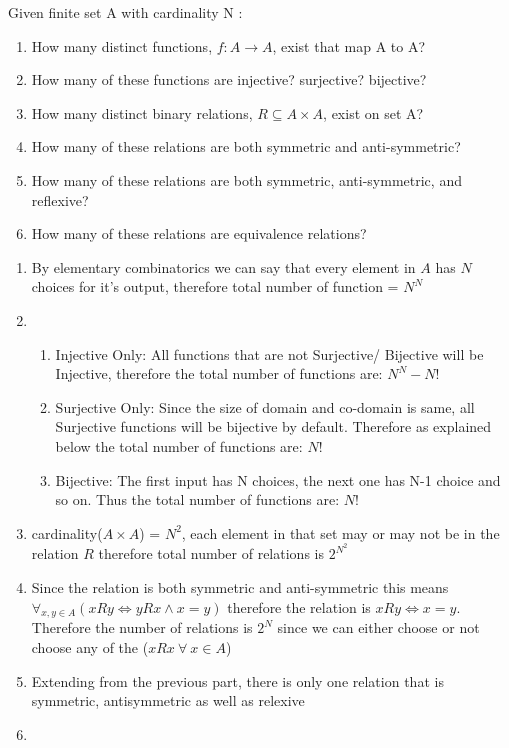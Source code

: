 \documentclass[12pt]{article}
\newenvironment{solution}[2][Solution]{ \begin{trivlist}
\item[\hskip \labelsep {\bfseries #1}]}{\end{trivlist}}
\newenvironment{problem}[2][Problem]{\begin{trivlist}
\item[\hskip \labelsep {\bfseries #1}\hskip \labelsep {\bfseries #2.}]}{\end{trivlist}}
\begin{document}
\vskip 0.5in

\begin{problem}{12}Given finite set A with cardinality N : 
\item[]
\begin{enumerate}[label=\alph*)]
    \item How many distinct functions, $f \colon A \rightarrow A$, exist that map A to A?
    \item How many of these functions are injective? surjective? bijective?
    \item How many distinct binary relations, $R \subseteq A \times A$, exist on set A?
    \item How many of these relations are both symmetric and anti-symmetric?
    \item How many of these relations are both symmetric, anti-symmetric, and reflexive? 
    \item How many of these relations are equivalence relations?
\end{enumerate}
\end{problem}
\begin{solution}{12}
\item[]
\begin{enumerate}[label=\alph*)]
    \item By elementary combinatorics we can say that every element in $A$ has $N$ choices for it's output, therefore total number of function = $N^N$
    \item 
    \begin{enumerate}[label=(\roman*)]
        \item Injective Only: All functions that are not Surjective/ Bijective will be  Injective, therefore the total number of functions are: $N^N - N!$
        \item Surjective Only: Since the size of domain and co-domain is same, all Surjective functions will be bijective by default. Therefore as explained below the total number of functions are: $N!$
        \item Bijective: The first input has N choices, the next one has N-1 choice and so on. Thus the total number of functions are: $N!$
    \end{enumerate}
    \item cardinality($A \times A$) = $N^2$, each element in that set may or may not be in the relation $R$ therefore total number of relations is $2^{N^2}$
    \item Since the relation is both symmetric and anti-symmetric this means $\forall_{x,y \in A}(xRy \Leftrightarrow yRx \wedge x = y)$ therefore the relation is $xRy \Leftrightarrow x = y$. Therefore the number of relations is $2^N$ since we can either choose or not choose any of the ($xRx\ \forall\ x \in A$)
    \item Extending from the previous part, there is only one relation that is symmetric, antisymmetric as well as relexive
    \item 
\end{enumerate}
\end{solution}
\end{document}
